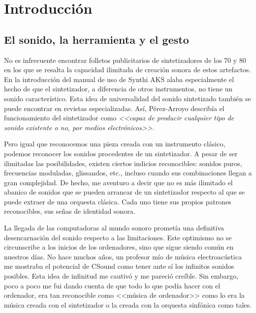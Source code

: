 \chapter[Introducción]{Introducción}

\section{El sonido, la herramienta y el gesto}


No es infrecuente encontrar folletos publicitarios de sintetizadores de los 70 y 80 en los que se resalta la capacidad ilimitada de creación sonora de estos artefactos. En la introducción del manual de uso de Synthi AKS \cite{SynthiAKS_brochure} alaba especialmente el hecho de que el sintetizador, a diferencia de otros instrumentos, no tiene un sonido característico. Esta idea de universalidad del sonido sintetizado también se puede encontrar en revistas especializadas. Así, Pérez-Arroyo describía el funcionamiento del sintetizador como \textit{<<capaz de producir cualquier tipo de sonido existente o no, por medios electrónicos>>}\cite{ritmo_542}. 

Pero igual que reconocemos una pieza creada con un instrumento clásico, podemos reconocer los sonidos procedentes de un sintetizador. A pesar de ser ilimitadas las posibilidades, existen ciertos indicios reconocibles: sonidos puros, frecuencias moduladas, glissandos, etc., incluso cuando sus combinaciones llegan a gran complejidad. De hecho, me aventuro a decir que no es más ilimitado el abanico de sonidos que se pueden arrancar de un sintetizador respecto al que se puede extraer de una orquesta clásica. Cada uno tiene sus propios patrones reconocibles, sus señas de identidad sonora. 

La llegada de las computadoras al mundo sonoro prometía una definitiva desencarnación del sonido respecto a las limitaciones. Este optimismo no se circunscribe a los inicios de los ordenadores, sino que sigue siendo común en nuestros días. No hace muchos años, un profesor mío de música electroacústica me mostraba el potencial de CSound como tener ante sí los infinitos sonidos posibles. Esta idea de infinitud me cautivó y me pareció creíble. Sin embargo, poco a poco me fui dando cuenta de que todo lo que podía hacer con el ordenador, era tan reconocible como <<música de ordenador>> como lo era la música creada con el sintetizador o la creada con la orquesta sinfónica como tales. 


